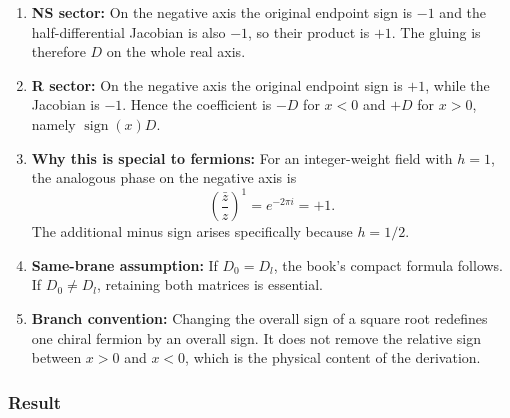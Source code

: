\documentclass[
  10pt,
  a4paper,
  openany]{book}
\begin{document}
\begin{enumerate}
\def\labelenumi{\arabic{enumi}.}
\item
  \textbf{NS sector:} On the negative axis the original endpoint sign is
  \(-1\) and the half-differential Jacobian is also \(-1\), so their
  product is \(+1\). The gluing is therefore \(D\) on the whole real
  axis.
\item
  \textbf{R sector:} On the negative axis the original endpoint sign is
  \(+1\), while the Jacobian is \(-1\). Hence the coefficient is \(-D\)
  for \(x<0\) and \(+D\) for \(x>0\), namely
  \(\operatorname{sign}(x)D\).
\item
  \textbf{Why this is special to fermions:} For an integer-weight field
  with \(h=1\), the analogous phase on the negative axis is \[
  \left(\frac{\bar z}{z}\right)^1
  =e^{-2\pi i}
  =+1.
  \] The additional minus sign arises specifically because \(h=1/2\).
\item
  \textbf{Same-brane assumption:} If \(D_0=D_l\), the book's compact
  formula follows. If \(D_0\neq D_l\), retaining both matrices is
  essential.
\item
  \textbf{Branch convention:} Changing the overall sign of a square root
  redefines one chiral fermion by an overall sign. It does not remove
  the relative sign between \(x>0\) and \(x<0\), which is the physical
  content of the derivation.
\end{enumerate}

\subsubsection{Result}\label{result-17}
\end{document}
